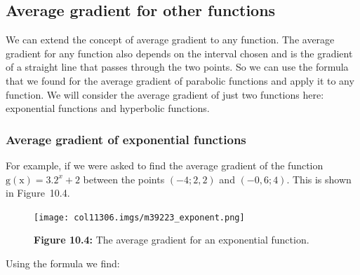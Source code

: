             \subsection{ Average gradient for other functions}
            \nopagebreak
\label{m39223*id7342}We can extend the concept of average gradient to any function. The average gradient for any function also depends on the interval chosen and is the gradient of a straight line that passes through the two points. So we can use the formula that we found for the average gradient of parabolic functions and apply it to any function. We will consider the average gradient of just two functions here: exponential functions and hyperbolic functions.
\par 
\label{m39223*cid452}
            \subsubsection{ Average gradient of exponential functions}
            \nopagebreak
\label{m39223*id734}For example, if we were asked to find the average gradient of the function $\mathrm{g\left(x\right)}=3.{2}^{x}+2$ between the points $\left(-4;\mathrm{2,2}\right)$ and $\left(-0,6;4\right)$. This is shown in Figure~10.4. 
    \setcounter{subfigure}{0}
	\begin{figure}[H] %
    \begin{center}
    \label{m39223*uid31!!!underscore!!!media}\label{m39223*uid31!!!underscore!!!printimage}\texttt{[image: col11306.imgs/m39223\_exponent.png]} %
      \vspace{2pt}
    \vspace{\rubberspace}\par \begin{cnxcaption}
	  \small \textbf{Figure 10.4: }The average gradient for an exponential function.
	\end{cnxcaption}
    \vspace{.1in}
    \end{center}
 \end{figure}       
Using the formula we find:
 \label{m39223*id193486}\nopagebreak\noindent{}
